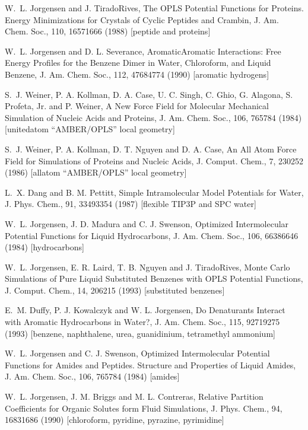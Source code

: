\documentclass[letterpaper,11pt,english]{sphinxmanual}
\begin{document}
W. L. Jorgensen and J. Tirado\sphinxhyphen{}Rives, The OPLS Potential Functions for Proteins. Energy Minimizations for Crystals of Cyclic Peptides and Crambin, J. Am. Chem. Soc., 110, 1657\sphinxhyphen{}1666 (1988)  {[}peptide and proteins{]}

W. L. Jorgensen and D. L. Severance, Aromatic\sphinxhyphen{}Aromatic Interactions: Free Energy Profiles for the Benzene Dimer in Water, Chloroform, and Liquid Benzene, J. Am. Chem. Soc., 112, 4768\sphinxhyphen{}4774 (1990)  {[}aromatic hydrogens{]}

S. J. Weiner, P. A. Kollman, D. A. Case, U. C. Singh, C. Ghio, G. Alagona, S. Profeta, Jr. and P. Weiner, A New Force Field for Molecular Mechanical Simulation of Nucleic Acids and Proteins, J. Am. Chem. Soc., 106, 765\sphinxhyphen{}784 (1984)  {[}united\sphinxhyphen{}atom “AMBER/OPLS” local geometry{]}

S. J. Weiner, P. A. Kollman, D. T. Nguyen and D. A. Case, An All Atom Force Field for Simulations of Proteins and Nucleic Acids, J. Comput. Chem., 7, 230\sphinxhyphen{}252 (1986)  {[}all\sphinxhyphen{}atom “AMBER/OPLS” local geometry{]}

L. X. Dang and B. M. Pettitt, Simple Intramolecular Model Potentials for Water, J. Phys. Chem., 91, 3349\sphinxhyphen{}3354 (1987)  {[}flexible TIP3P and SPC water{]}

W. L. Jorgensen, J. D. Madura and C. J. Swenson, Optimized Intermolecular Potential Functions for Liquid Hydrocarbons, J. Am. Chem. Soc., 106, 6638\sphinxhyphen{}6646 (1984)  {[}hydrocarbons{]}

W. L. Jorgensen, E. R. Laird, T. B. Nguyen and J. Tirado\sphinxhyphen{}Rives, Monte Carlo Simulations of Pure Liquid Substituted Benzenes with OPLS Potential Functions, J. Comput. Chem., 14, 206\sphinxhyphen{}215 (1993)  {[}substituted benzenes{]}

E. M. Duffy, P. J. Kowalczyk and W. L. Jorgensen, Do Denaturants Interact with Aromatic Hydrocarbons in Water?, J. Am. Chem. Soc., 115, 9271\sphinxhyphen{}9275 (1993)  {[}benzene, naphthalene, urea, guanidinium, tetramethyl ammonium{]}

W. L. Jorgensen and C. J. Swenson, Optimized Intermolecular Potential Functions for Amides and Peptides. Structure and Properties of Liquid Amides, J. Am. Chem. Soc., 106, 765\sphinxhyphen{}784 (1984)  {[}amides{]}

W. L. Jorgensen, J. M. Briggs and M. L. Contreras, Relative Partition Coefficients for Organic Solutes form Fluid Simulations, J. Phys. Chem., 94, 1683\sphinxhyphen{}1686 (1990)  {[}chloroform, pyridine, pyrazine, pyrimidine{]}
\end{document}
